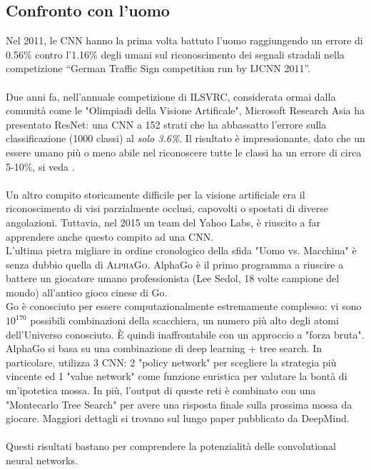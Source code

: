 \subsection{Confronto con l'uomo}
Nel 2011, le CNN hanno la prima volta battuto l’uomo raggiungendo un errore di 0.56\% contro l’1.16\% degli umani sul riconoscimento dei segnali stradali nella competizione “German Traffic Sign competition run by IJCNN 2011”. \\
\\
Due anni fa, nell'annuale competizione di ILSVRC, considerata ormai dalla comunità come le "Olimpiadi della Visione Artificale", Microsoft Research Asia ha presentato ResNet\parencite{resnet}: una CNN a 152 strati che ha abbassatto l'errore sulla classificazione (1000 classi) al \emph{solo 3.6\%}. Il risultato è impressionante, dato che un essere umano più o meno abile nel riconoscere tutte le classi ha un errore di circa 5-10\%, si veda \parencite{Wkarpa}. \\
\\
Un altro compito storicamente difficile per la visione artificiale era il riconoscimento di visi parzialmente occlusi, capovolti o spostati di diverse angolazioni. Tuttavia, nel 2015 un team del Yahoo Labs, è riuscito a far apprendere anche questo compito ad una CNN\parencite{WMit}.\\

L'ultima pietra migliare in ordine cronologico della sfida "Uomo vs. Macchina" è senza dubbio quella di \textsc{AlphaGo}\parencite{WAlphaGo}. AlphaGo è il primo programma a riuscire a battere un giocatore umano professionista (Lee Sedol, 18 volte campione del mondo) all'antico gioco cinese di Go. \\
Go è conosciuto per essere computazionalmente estremamente complesso: vi sono $10^{170}$ possibili combinazioni della scacchiera, un numero più alto degli atomi dell'Universo conosciuto. È quindi inaffrontabile con un approccio a "forza bruta". 
\\
AlphaGo si basa su una combinazione di deep learning + tree search. In particolare, utilizza 3 CNN: 2 "policy network" per scegliere la strategia più vincente ed 1 "value network" come funzione euristica per valutare la bontà di un'ipotetica mossa. In più, l'output di queste reti è combinato con una "Montecarlo Tree Search" per avere una risposta finale sulla prossima mossa da giocare. Maggiori dettagli si trovano sul lungo paper pubblicato da DeepMind\parencite{AlphaGo}. \\
\\
Questi risultati bastano per comprendere la potenzialità delle convolutional neural networks.
